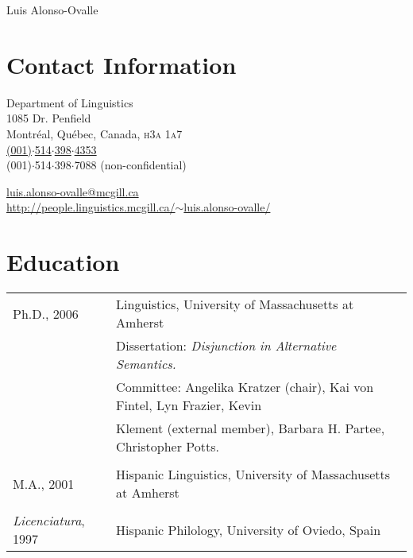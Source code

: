 \documentclass[11pt]{article}
\begin{document}
\markright{}
\thispagestyle{plain}
\author{}
\vspace{-2cm}
\begin{center}
{\LARGE Luis Alonso-Ovalle}
\end{center}

\vspace{.4cm}

\section*{Contact Information}
\begin{multicols}{2}
Department of Linguistics\\
1085 Dr. Penfield\\
Montr\'eal, Qu\'ebec, Canada, \textsc{h3a 1a7}\\
\Telefon \hspace{2pt} \href{tel:0015143984353}{(001)$\cdot$514$\cdot$398$\cdot$4353}
\\
\hspace{1pt} \FAX \hspace{1pt} (001)$\cdot$514$\cdot$398$\cdot$7088
(non-confidential) \\
\end{multicols}
\vspace{-12pt}
\Letter \hspace{3pt}  \href{mailto:luis.alonso-ovalle@mcgill.ca}{luis.alonso-ovalle@mcgill.ca}\\
\ComputerMouse \hspace{6pt}
\href{http://people.linguistics.mcgill.ca/~luis.alonso-ovalle/}{http://people.linguistics.mcgill.ca/$\sim$luis.alonso-ovalle/}

\section*{Education}

\begin{tabular}{p{2.815cm}p{280pt}}
Ph.D., 2006 &  Linguistics, University of Massachusetts at Amherst\\
 & {\footnotesize Dissertation: \textit{Disjunction in Alternative Semantics.}}\\
 &  {\footnotesize Committee: Angelika Kratzer (chair), Kai von Fintel, Lyn Frazier,
Kevin}\\
& {\footnotesize Klement (external member), Barbara H. Partee, Christopher Potts.}\\
&  \\[-8pt]
M.A., 2001   & Hispanic Linguistics, University of Massachusetts at Amherst\\
 &  \\[-8pt]
\textit{Licenciatura}, 1997  & Hispanic Philology,  University of Oviedo, Spain\\
\end{tabular}
\end{document}
